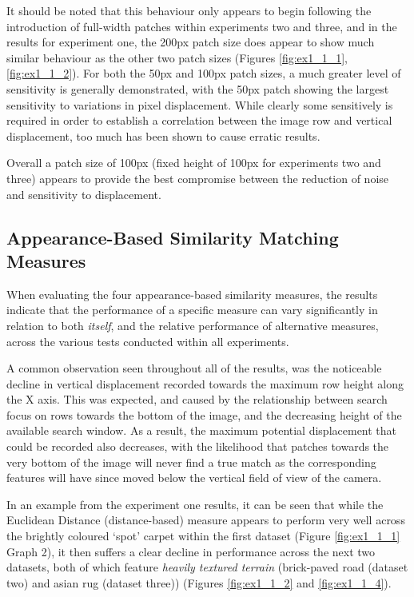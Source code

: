 It should be noted that this behaviour only appears to begin following the introduction of full-width patches within experiments two and three, and in the results for experiment one, the 200px patch size does appear to show much similar behaviour as the other two patch sizes (Figures \ref{fig:ex1_1_1}, \ref{fig:ex1_1_2}). For both the 50px and 100px patch sizes, a much greater level of sensitivity is generally demonstrated, with the 50px patch showing the largest sensitivity to variations in pixel displacement. While clearly some sensitively is required in order to establish a correlation between the image row and vertical displacement, too much has been shown to cause erratic results.

Overall a patch size of 100px (fixed height of 100px for experiments two and three) appears to provide the best compromise between the reduction of noise and sensitivity to displacement.

\subsection{Appearance-Based Similarity Matching Measures}

When evaluating the four appearance-based similarity measures, the results indicate that the performance of a specific measure can vary significantly in relation to both \textit{itself}, and the relative performance of alternative measures, across the various tests conducted within all experiments. 

A common observation seen throughout all of the results, was the noticeable decline in vertical displacement recorded towards the maximum row height along the X axis. This was expected, and caused by the relationship between search focus on rows towards the bottom of the image, and the decreasing height of the available search window. As a result, the maximum potential displacement that could be recorded also decreases, with the likelihood that patches towards the very bottom of the image will never find a true match as the corresponding features will have since moved below the vertical field of view of the camera. 

In an example from the experiment one results, it can be seen that while the Euclidean Distance (distance-based) measure appears to perform very well across the brightly coloured `spot' carpet within the first dataset (Figure \ref{fig:ex1_1_1} Graph 2), it then suffers a clear decline in performance across the next two datasets, both of which feature \textit{heavily textured terrain} (brick-paved road (dataset two) and asian rug (dataset three)) (Figures \ref{fig:ex1_1_2} and \ref{fig:ex1_1_4}). 

